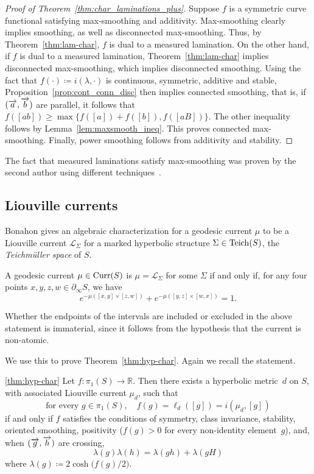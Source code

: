 \begin{proof}[Proof of Theorem~\ref{thm:char_laminations_plus}]
  Suppose $f$ is a symmetric curve functional satisfying max-smoothing and
  additivity. Max-smoothing clearly implies smoothing, as well as
  disconnected max-smoothing. Thus, by
  Theorem~\ref{thm:lam-char}, $f$ is dual to a measured
  lamination. On the other hand, if $f$ is dual to a measured
  lamination, Theorem~\ref{thm:lam-char} implies disconnected
  max-smoothing, which implies disconnected smoothing. Using the fact
  that $f(\cdot) \coloneqq i(\lambda, \cdot)$ is continuous,
  symmetric, additive and stable,
  Proposition~\ref{prop:cont_conn_disc} then implies connected
  smoothing, that is, if $(\overrightarrow{a},\overrightarrow{b})$ are parallel, it follows
  that $f([ab]) \geq \max \{ f([a])+f([b]), f([aB])\}$. The other
  inequality follows by Lemma~\ref{lem:maxsmooth_ineq}. This proves connected max-smoothing.
  Finally, power smoothing follows from additivity and stability.
\end{proof}

The fact that measured laminations satisfy max-smoothing was proven by
the second author using
different techniques~\cite{Thu00:GeometricIntersection}.

\subsection{Liouville currents}
\label{subsec:liouville}
Bonahon gives an algebraic characterization for a geodesic current $\mu$ to be a Liouville current $\mathcal{L}_\Sigma$ for a marked hyperbolic structure $\Sigma \in \operatorname{Teich}(S)$, the \emph{Teichm\"uller space} of $S$.

\begin{theorem}   \label{thm:bonahonliouville}
   A geodesic current $\mu \in \operatorname{Curr}(S)$ is $\mu=\mathcal{L}_{\Sigma}$ for some $\Sigma$ if and only if, for any four points $x,y,z,w \in \partial_{\infty} S$, we have
   \[
      e^{-\mu([x,y]\times[z,w])} + e^{-\mu([y,z]\times [w,x])}=1.
   \]
\end{theorem}
Whether the endpoints of the intervals are included or excluded in the
above statement is immaterial, since it follows from the hypothesis that the current is non-atomic. 

We use this to prove Theorem~\ref{thm:hyp-char}. Again we recall the statement.

\begin{taggedthm}{\ref{thm:hyp-char}}
Let $f \colon \pi_1(S) \to \mathbb{R}$.
Then there exists a  hyperbolic metric~$d$
on $S$, with associated Liouville current $\mu_d$, such that
\[
\text{for every } g\in \pi_1(S),\quad
f(g) = \ell_d([g]) = i(\mu_d,[g])
\]
if and only if $f$ satisfies the conditions of symmetry, class invariance,
stability, oriented smoothing,
positivity ($f(g) > 0$ for every non-identity element~$g$),
and, when $(\overrightarrow{g},\overrightarrow{h})$ are crossing,
\[
\lambda(g)\lambda(h)
  = \lambda(gh)+\lambda(gH)
\]
where $\lambda(g)\coloneqq 2\cosh\!\bigl(f(g)/2\bigr)$.
\end{taggedthm}

